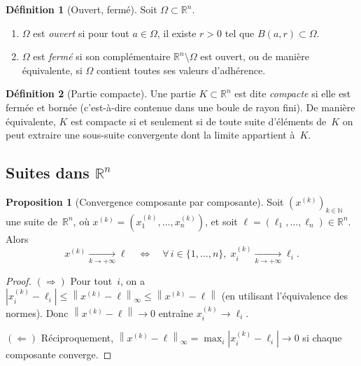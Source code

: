 \documentclass[12pt,a4paper,openany]{book}
\theoremstyle{definition}
\newtheorem{definition}{Définition}[chapter]
\newtheorem{proposition}{Proposition}[chapter]
\newcommand{\N}{\mathbb{N}}
\newcommand{\R}{\mathbb{R}}
\newcommand{\abs}[1]{\left\lvert #1 \right\rvert}
\newcommand{\norm}[1]{\left\lVert #1 \right\rVert}
\begin{document}
\begin{definition}[Ouvert, fermé]\label{def:ouvert-ferme}
  Soit $\Omega \subset \R^n$.
  \begin{enumerate}[label=(\roman*)]
    \item $\Omega$ est \emph{ouvert} si pour tout $a \in \Omega$, il existe $r > 0$ tel que $B(a, r) \subset \Omega$.
    \item $\Omega$ est \emph{fermé} si son complémentaire $\R^n \setminus \Omega$ est ouvert, ou de manière équivalente, si $\Omega$ contient toutes ses valeurs d'adhérence.
  \end{enumerate}
\end{definition}

\begin{definition}[Partie compacte]\label{def:compact-Rn}
  Une partie $K \subset \R^n$ est dite \emph{compacte} si elle est fermée et bornée (c'est-à-dire contenue dans une boule de rayon fini). De manière équivalente, $K$ est compacte si et seulement si de toute suite d'éléments de~$K$ on peut extraire une sous-suite convergente dont la limite appartient à~$K$.
\end{definition}

\subsection{Suites dans \texorpdfstring{$\R^n$}{Rn}}
\label{subsec:suites-Rn}

\begin{proposition}[Convergence composante par composante]
  \label{prop:convergence-composante}
  Soit $(x^{(k)})_{k \in \N}$ une suite de~$\R^n$, où $x^{(k)} = (x_1^{(k)}, \ldots, x_n^{(k)})$, et soit $\ell = (\ell_1, \ldots, \ell_n) \in \R^n$. Alors
  \[
    x^{(k)} \xrightarrow[k \to +\infty]{} \ell
    \quad \iff \quad
    \forall\, i \in \{1, \ldots, n\},\;
    x_i^{(k)} \xrightarrow[k \to +\infty]{} \ell_i.
  \]
\end{proposition}

\begin{proof}
  $(\Rightarrow)$ Pour tout~$i$, on a $\abs{x_i^{(k)} - \ell_i} \leqslant \norm{x^{(k)} - \ell}_\infty \leqslant \norm{x^{(k)} - \ell}$ (en utilisant l'équivalence des normes). Donc $\norm{x^{(k)} - \ell} \to 0$ entraîne $x_i^{(k)} \to \ell_i$.

  $(\Leftarrow)$ Réciproquement, $\norm{x^{(k)} - \ell}_\infty = \max_i \abs{x_i^{(k)} - \ell_i} \to 0$ si chaque composante converge.
\end{proof}
\end{document}

